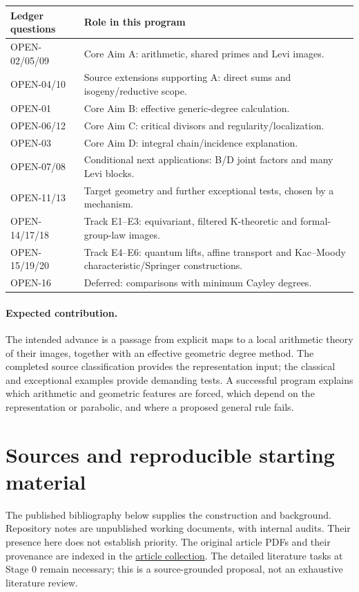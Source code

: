 \documentclass[11pt,letterpaper]{article}
\newcommand{\repo}{https://github.com/sean-rogers-t/Sage-programs/blob/e9fcb7f3b7d28bea9c248abab1f01d8de28250aa/}
\newcommand{\record}[2]{\href{\repo#1}{#2}}
\begin{document}
\noindent\begin{tabularx}{\linewidth}{@{}p{1.4in}Y@{}}
\toprule
Ledger questions & Role in this program\\
\midrule
OPEN-02/05/09 & Core Aim A: arithmetic, shared primes and Levi images.\\
OPEN-04/10 & Source extensions supporting A: direct sums and isogeny/reductive scope.\\
OPEN-01 & Core Aim B: effective generic-degree calculation.\\
OPEN-06/12 & Core Aim C: critical divisors and regularity/localization.\\
OPEN-03 & Core Aim D: integral chain/incidence explanation.\\
OPEN-07/08 & Conditional next applications: B/D joint factors and many Levi blocks.\\
OPEN-11/13 & Target geometry and further exceptional tests, chosen by a mechanism.\\
OPEN-14/17/18 & Track E1--E3: equivariant, filtered K-theoretic
and formal-group-law images.\\
OPEN-15/19/20 & Track E4--E6: quantum lifts, affine transport and
Kac--Moody characteristic/Springer constructions.\\
OPEN-16 & Deferred: comparisons with minimum Cayley degrees.\\
\bottomrule
\end{tabularx}

\paragraph{Expected contribution.}
The intended advance is a passage from explicit maps to a local arithmetic
theory of their images, together with an effective geometric degree method.
The completed source classification provides the representation input;
the classical and exceptional examples provide demanding tests.
A successful program explains which arithmetic and geometric features are
forced, which depend on the representation or parabolic, and where a proposed
general rule fails.

\newpage
\section*{Sources and reproducible starting material}
The published bibliography below supplies the construction and background.
Repository notes are unpublished working documents, with internal audits.
Their presence here does not establish priority. The original article PDFs
and their provenance are indexed in the
\record{articles/README.md}{article collection}.
The detailed literature tasks at Stage 0 remain necessary; this is a
source-grounded proposal, not an exhaustive literature review.
\end{document}

